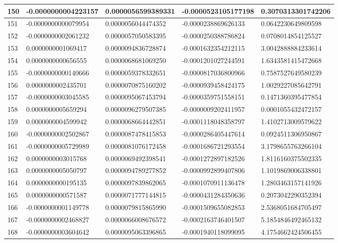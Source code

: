 \begin{center}
\begin{longtable}{|p{0.5cm}|p{3.5cm}|p{3.5cm}|p{3.5cm}|p{3.5cm}|}
\hline
150  & -0.0000000004223157  & 0.0000056599389331  & -0.0000523105177198  & 0.3070313301742206\\
\hline
151  & -0.0000000000079954  & 0.0000056044474352  & -0.0000238869626133  & 0.0642230649809598\\
\hline
152  & -0.0000000002061232  & 0.0000057050583395  & -0.0000250388786824  & 0.0708014854125527\\
\hline
153  & 0.0000000001069417  & 0.0000094836728874  & -0.0001632354212115  & 3.0042888884233614\\
\hline
154  & 0.0000000000656555  & 0.0000068681069250  & -0.0001201027244591  & 1.6343581415472668\\
\hline
155  & -0.0000000000140666  & 0.0000059378332651  & -0.0000817036800966  & 0.7587527649580239\\
\hline
156  & 0.0000000002435701  & 0.0000070875160202  & -0.0000939458424175  & 1.0029227085642791\\
\hline
157  & -0.0000000003045585  & 0.0000095067453794  & -0.0000359751558151  & 0.1471360395477854\\
\hline
158  & 0.0000000005659294  & 0.0000096279507385  & -0.0000009202411957  & 0.0001055432472157\\
\hline
159  & 0.0000000004599942  & 0.0000068664442851  & -0.0001118048358797  & 1.4102713009579622\\
\hline
160  & -0.0000000002502867  & 0.0000087478415853  & -0.0000286405447614  & 0.0924511306950867\\
\hline
161  & -0.0000000005729989  & 0.0000081076172458  & -0.0001686721293554  & 3.1798655763266104\\
\hline
162  & 0.0000000003015768  & 0.0000069492398541  & -0.0001272897182526  & 1.8116160375502335\\
\hline
163  & 0.0000000005050797  & 0.0000094789277852  & -0.0000992899407806  & 1.1019869006338801\\
\hline
164  & 0.0000000000195135  & 0.0000097839862065  & -0.0001070911136478  & 1.2803463157141926\\
\hline
165  & 0.0000000000571587  & 0.0000071777144815  & -0.0000431284350636  & 0.2073042290352394\\
\hline
166  & -0.0000000001149778  & 0.0000079815865990  & -0.0001509655082853  & 2.5368051684705497\\
\hline
167  & -0.0000000002468827  & 0.0000066008676572  & -0.0002163746401507  & 5.1854846492465132\\
\hline
168  & -0.0000000003604642  & 0.0000095063396865  & -0.0001940118099095  & 4.1754662424506455\\

\end{longtable}
\end{center}
